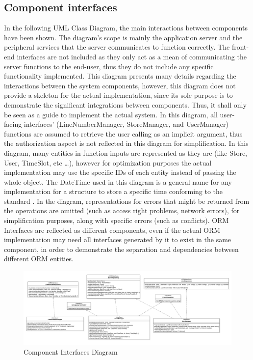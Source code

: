 \subsection{Component interfaces}
In the following UML Class Diagram, the main interactions between components have been shown.
The diagram's scope is mainly the application server and the peripheral services that the server communicates to function correctly.
The front-end interfaces are not included as they only act as a mean of communicating the server functions to the end-user, thus they do not include any specific functionality implemented.
This diagram presents many details regarding the interactions between the system components, however, this diagram does not provide a skeleton for the actual implementation, since its sole purpose is to demonstrate the significant integrations between components.
Thus, it shall only be seen as a guide to implement the actual system.
In this diagram, all user-facing interfaces' (LineNumberManager, StoreManager, and UserManager) functions are assumed to retrieve the user calling as an implicit argument, thus the authorization aspect is not reflected in this diagram for simplification.
In this diagram, many entities in function inputs are represented as they are (like Store, User, TimeSlot, etc \ldots), however for optimization purposes the actual implementation may use the specific IDs of each entity instead of passing the whole object.
The DateTime used in this diagram is a general name for any implementation for a structure to store a specific time conforming to the standard \cite{}.
In the diagram, representations for errors that might be returned from the operations are omitted (such as access right problems, network errors), for simplification purposes, along with specific errors (such as conflicts).
ORM Interfaces are reflected as different components, even if the actual ORM implementation may need all interfaces generated by it to exist in the same component, in order to demonstrate the separation and dependencies between different ORM entities.
\begin{figure}[H]
    \centering
    \includegraphics[height=0.4\textwidth]{Images/ComponentInterfacesDiagram.png}
    \caption{Component Interfaces Diagram}
    \label{fig:ComponentInterfaces}
\end{figure}
